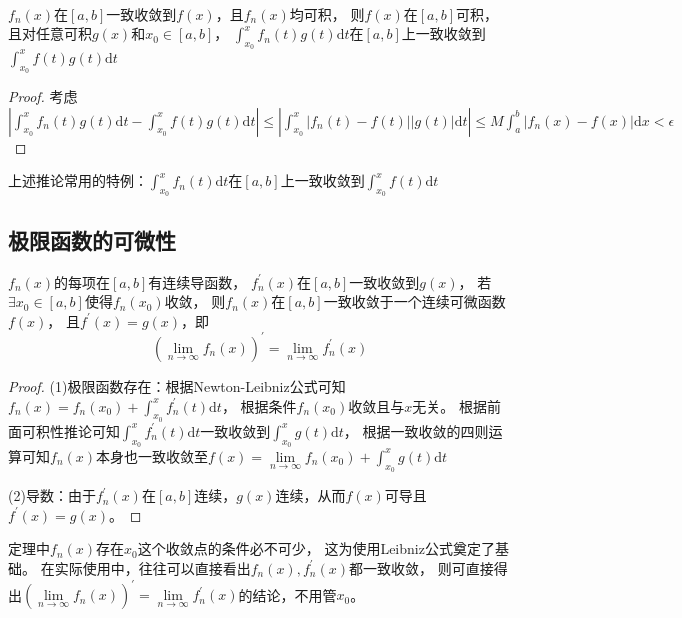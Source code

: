 ~

\begin{corollary}[可积性推广]
  $f_n(x)$在$[a,b]$一致收敛到$f(x)$，且$f_n(x)$均可积，
  则$f(x)$在$[a,b]$可积，且对任意可积$g(x)$和$x_0 \in [a,b]$，
  $\int_{x_0}^x f_n(t)g(t)\mathrm{d} t$在$[a,b]$上一致收敛到$\int_{x_0}^x f(t)g(t) \mathrm{d} t$
\end{corollary}

\begin{proof}
  考虑$\left|\int_{x_0}^xf_n(t) g(t) \mathrm{d} t - \int_{x_0}^x f(t)g(t)\mathrm{d} t \right| \leq \left|\int_{x_0}^x |f_n(t) - f(t)||g(t)|\mathrm{d} t \right| \leq M \int_a^b |f_n(x) - f(x)|\mathrm{d} x < \epsilon$
\end{proof}

\begin{note}
  上述推论常用的特例：$\int_{x_0}^xf_n(t)\mathrm{d} t$在$[a,b]$上一致收敛到$\int_{x_0}^xf(t)\mathrm{d} t$
\end{note}

\subsection{极限函数的可微性}

\begin{theorem}[可微性]
  $f_n(x)$的每项在$[a,b]$有连续导函数，
  $f_n^{\prime}(x)$在$[a,b]$一致收敛到$g(x)$，
  若$\exists x_0 \in [a,b]$使得$f_n(x_0)$收敛，
  则$f_n(x)$在$[a,b]$一致收敛于一个连续可微函数$f(x)$，
  且$f^{\prime}(x) = g(x)$，即
  \begin{equation*}
    (\lim \limits _{n \rightarrow \infty} f_n(x))^{\prime} = \lim \limits _{n \rightarrow \infty} f_n^{\prime}(x)
  \end{equation*}
\end{theorem}

\begin{proof}
  (1)极限函数存在：根据Newton-Leibniz公式可知$f_n(x) = f_n(x_0) + \int_{x_0}^xf_n^{\prime}(t)\mathrm{d} t$，
  根据条件$f_n(x_0)$收敛且与$x$无关。
  根据前面可积性推论可知$\int_{x_0}^xf_n^{\prime}(t)\mathrm{d} t$一致收敛到$\int_{x_0}^xg(t)\mathrm{d} t$，
  根据一致收敛的四则运算可知$f_n(x)$本身也一致收敛至$f(x) = \lim \limits _{n \rightarrow \infty} f_n(x_0) + \int_{x_0}^x g(t) \mathrm{d} t$

  (2)导数：由于$f_n^{\prime}(x)$在$[a,b]$连续，$g(x)$连续，从而$f(x)$可导且$f^{\prime}(x) = g(x)$。
\end{proof}

\begin{note}
  定理中$f_n(x)$存在$x_0$这个收敛点的条件必不可少，
  这为使用Leibniz公式奠定了基础。
  在实际使用中，往往可以直接看出$f_n(x),f^{\prime}_n(x)$都一致收敛，
  则可直接得出$(\lim \limits _{n \rightarrow \infty} f_n(x))^{\prime} = \lim \limits _{n \rightarrow \infty} f_n^{\prime}(x)$的结论，不用管$x_0$。
\end{note}

